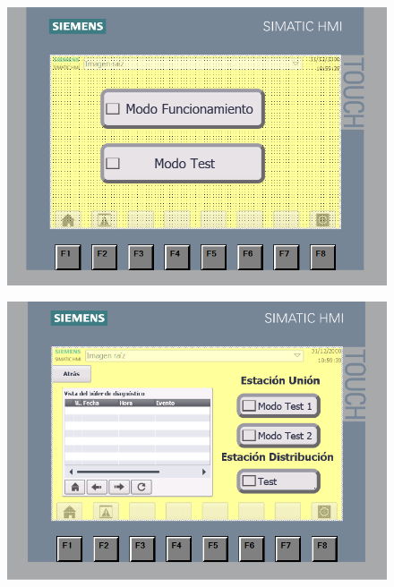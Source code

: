 \begin{figure}[H]
  \centering

  \begin{minipage}{0.6\textwidth}
    \centering
    \includegraphics[width=\textwidth]{figs/HMI_inicio}
    \label{fig:HMI_inicio}
  \end{minipage}
  \hfill
  \begin{minipage}{0.6\textwidth}
    \centering
    \includegraphics[width=\textwidth]{figs/HMI_test_principal}
    \label{fig:HMI_test_principal}
  \end{minipage}

\end{figure}


